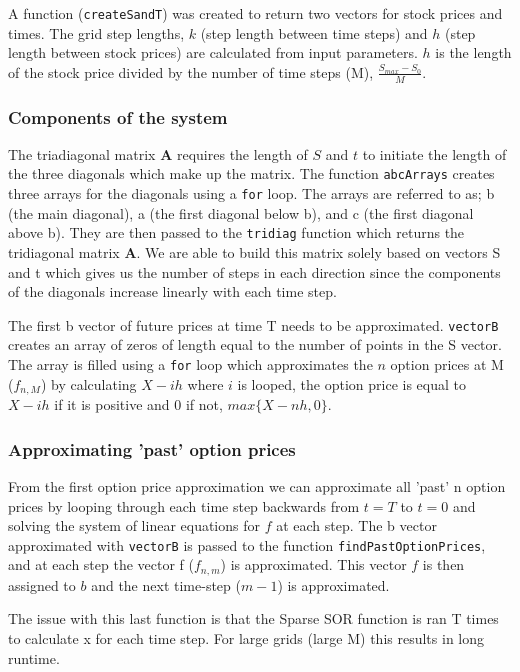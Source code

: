 \documentclass[paper=a4, fontsize=10pt]{scrartcl} %
\begin{document}
A function (\texttt{createSandT}) was created to return two vectors for stock prices and times. The grid step lengths, $k$ (step length between time steps) and $h$ (step length between stock prices) are calculated from input parameters. $h$ is the length of the stock price divided by the number of time steps (M), $\frac{S_{max} - S_{0}}{M}$.

\subsubsection{Components of the system}
The triadiagonal matrix $\textbf{A}$ requires the length of $S$ and $t$ to initiate the length of the three diagonals which make up the matrix. The function \texttt{abcArrays} creates three arrays for the diagonals using a \texttt{for} loop. The arrays are referred to as; b (the main diagonal), a (the first diagonal below b), and c (the first diagonal above b). They are then passed to the \texttt{tridiag} function which returns the tridiagonal matrix $\textbf{A}$. We are able to build this matrix solely based on vectors S and t which gives us the number of steps in each direction since the components of the diagonals increase linearly with each time step. 

The first b vector of future prices at time T needs to be approximated. \texttt{vectorB} creates an array of zeros of length equal to the number of points in the S vector. The array is filled using a \texttt{for} loop which approximates the $n$ option prices at M ($f_{n,M}$) by calculating $X - ih$ where $i$ is looped, the option price is equal to $X - ih$ if it is positive and 0 if not, $max \{ X - nh, 0 \}$.

\subsubsection{Approximating 'past' option prices}

From the first option price approximation we can approximate all 'past' n option prices by looping through each time step backwards from $t=T$ to $t=0$ and solving the system of linear equations for $f$ at each step. The b vector approximated with \texttt{vectorB} is passed to the function \texttt{findPastOptionPrices}, and at each step the vector f ($f_{n,m}$) is approximated. This vector $f$ is then assigned to $b$ and the next time-step ($m-1$) is approximated.

The issue with this last function is that the Sparse SOR function is ran T times to calculate x for each time step. For large grids (large M) this results in long runtime.
\end{document}
